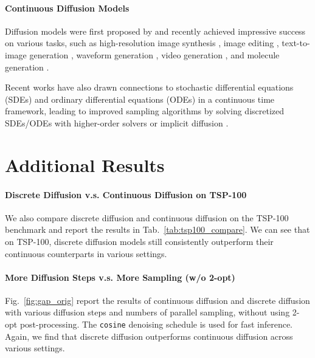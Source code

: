 \paragraph{Continuous Diffusion Models}

Diffusion models were first proposed by \citet{sohl2015deep} and recently achieved impressive success on various tasks, such as high-resolution image synthesis \citep{dhariwal2021diffusion,ho2022cascaded}, image editing \citep{meng2021sdedit,saharia2022palette}, text-to-image generation \citep{nichol2021glide,saharia2022photorealistic,rombach2022high,ramesh2022hierarchical,gu2022vector}, waveform generation \citep{chen2020wavegrad,chen2021wavegrad,liu2022diffsinger}, video generation \citep{ho2022video,ho2022imagen,singer2022make}, and molecule generation \citep{xu2021geodiff,hoogeboom2022equivariant,wu2022diffusion}.

Recent works have also drawn connections to stochastic differential equations (SDEs) \citep{song2021score} and ordinary differential equations (ODEs) \citep{song2021denoising} in a continuous time framework, leading to improved sampling algorithms by solving discretized SDEs/ODEs with higher-order solvers \citep{liu2021pseudo,lu2022dpmpp,lu2022dpm} or implicit diffusion \citep{song2021denoising}.


\section{Additional Results}

\paragraph{Discrete Diffusion v.s. Continuous Diffusion on TSP-100}
We also compare discrete diffusion and continuous diffusion on the TSP-100 benchmark and report the results in Tab.~\ref{tab:tsp100_compare}. We can see that on TSP-100, discrete diffusion models still consistently outperform their continuous counterparts in various settings.

\paragraph{More Diffusion Steps v.s. More Sampling (w/o 2-opt)} 
Fig.~\ref{fig:gap_orig} report the results of continuous diffusion and discrete diffusion with various diffusion steps and numbers of parallel sampling, without using 2-opt post-processing. The \texttt{cosine} denoising schedule is used for fast inference. Again, we find that discrete diffusion outperforms continuous diffusion across various settings. 


